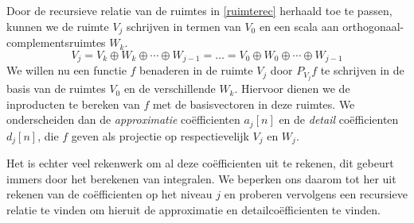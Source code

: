 Door de recursieve relatie van de ruimtes in \ref{ruimterec} herhaald toe te passen,
kunnen we de ruimte $V_j$ schrijven in termen van $V_0$ en een scala aan
orthogonaal-complementsruimtes $W_k$.
\begin{equation}
  \label{ruimte_splitsing}
  V_j = V_k \oplus W_k \oplus \cdots \oplus W_{j-1} = \ldots
  = V_0 \oplus W_0 \oplus \cdots \oplus W_{j-1}
\end{equation}
We willen nu een functie $f$ benaderen in de ruimte $V_j$ door $P_{V_j}f$ te schrijven in
de basis van de ruimtes $V_0$ en de verschillende $W_k$. Hiervoor dienen we de inproducten
te bereken van $f$ met de basisvectoren in deze ruimtes.
We onderscheiden dan de \emph{approximatie}
co\"efficienten $a_j[n]$ en de \emph{detail} co\"efficienten $d_j[n]$, die
$f$ geven als projectie op  respectievelijk $V_j$ en $W_j$.

Het is echter veel rekenwerk om al deze co\"efficienten uit te rekenen, dit gebeurt immers
door het berekenen van integralen. We beperken ons daarom tot her uit rekenen van de
co\"efficienten op het niveau $j$ en proberen vervolgens een recursieve relatie te vinden
om hieruit de approximatie en detailco\"efficienten te vinden.

